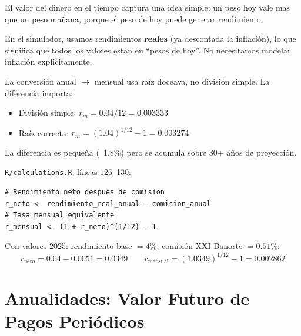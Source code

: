 \documentclass[11pt,a4paper]{report}
\theoremstyle{remark}
\begin{document}
\begin{tcolorbox}[colback=green!5!white, colframe=green!50!black, title=\textbf{Intuici\'on}]
El valor del dinero en el tiempo captura una idea simple: un peso hoy vale m\'as que un peso ma\~nana, porque el peso de hoy puede generar rendimiento.

En el simulador, usamos rendimientos \textbf{reales} (ya descontada la inflaci\'on), lo que significa que todos los valores est\'an en ``pesos de hoy''. No necesitamos modelar inflaci\'on expl\'icitamente.

La conversi\'on anual $\to$ mensual usa ra\'iz doceava, no divisi\'on simple. La diferencia importa:
\begin{itemize}
  \item Divisi\'on simple: $r_m = 0.04/12 = 0.003333$
  \item Ra\'iz correcta: $r_m = (1.04)^{1/12} - 1 = 0.003274$
\end{itemize}
La diferencia es peque\~na (~1.8\%) pero se acumula sobre 30+ a\~nos de proyecci\'on.
\end{tcolorbox}

\begin{tcolorbox}[colback=orange!5!white, colframe=orange!75!black, title=\textbf{Aplicaci\'on en C\'odigo}]
\texttt{R/calculations.R}, l\'ineas 126--130:
\begin{lstlisting}
# Rendimiento neto despues de comision
r_neto <- rendimiento_real_anual - comision_anual
# Tasa mensual equivalente
r_mensual <- (1 + r_neto)^(1/12) - 1
\end{lstlisting}

Con valores 2025: rendimiento base $= 4\%$, comisi\'on XXI Banorte $= 0.51\%$:
\[
r_{\text{neto}} = 0.04 - 0.0051 = 0.0349 \qquad r_{\text{mensual}} = (1.0349)^{1/12} - 1 = 0.002862
\]
\end{tcolorbox}

\section{Anualidades: Valor Futuro de Pagos Peri\'odicos}
\end{document}
